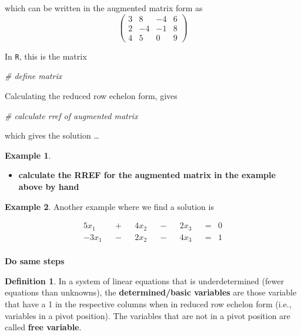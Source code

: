 \documentclass[
]{book}
\newenvironment{Shaded}{\begin{snugshade}}{\end{snugshade}}
\newcommand{\CommentTok}[1]{\textcolor[rgb]{0.56,0.35,0.01}{\textit{#1}}}
\providecommand{\tightlist}{%
  \setlength{\itemsep}{0pt}\setlength{\parskip}{0pt}}
\theoremstyle{definition}
\newtheorem{definition}{Definition}[chapter]
\theoremstyle{definition}
\newtheorem{example}{Example}[chapter]
\theoremstyle{definition}
\theoremstyle{definition}
\theoremstyle{remark}
\begin{document}
which can be written in the augmented matrix form as
\[
\begin{pmatrix} 3 & 8 & -4 & 6 \\ 2 & -4 & -1 & 8 \\ 4 & 5 & 0 & 9 \end{pmatrix}
\]

In \texttt{R}, this is the matrix

\begin{Shaded}
\begin{Highlighting}[]
\CommentTok{# define matrix}
\end{Highlighting}
\end{Shaded}

Calculating the reduced row echelon form, gives

\begin{Shaded}
\begin{Highlighting}[]
\CommentTok{# calculate rref of augmented matrix}
\end{Highlighting}
\end{Shaded}

which gives the solution \ldots{}

\begin{example}

\begin{itemize}
\tightlist
\item
  \textbf{calculate the RREF for the augmented matrix in the example above by hand}
\end{itemize}

\end{example}

\begin{example}
Another example where we find a solution is

\[
\begin{aligned}
5 x_1 && + && 4 x_2 && - && 2 x_3 && = & 0 \\
-3 x_1 && - && 2 x_2 && - && 4 x_3 && = & 1 \\
\end{aligned}
\]

\textbf{Do same steps}
\end{example}

\begin{definition}
In a system of linear equations that is underdetermined (fewer equations than unknowns), the \textbf{determined/basic variables} are those variable that have a 1 in the respective columns when in reduced row echelon form (i.e., variables in a pivot position). The variables that are not in a pivot position are called \textbf{free variable}.
\end{definition}
\end{document}

